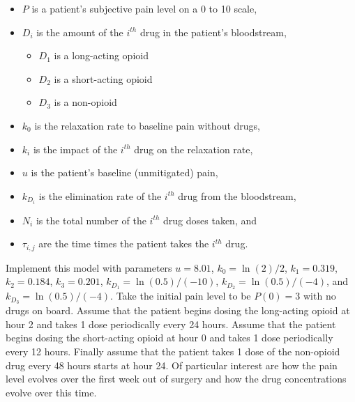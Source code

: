 \begin{itemize}
    \item $P$ is a patient's subjective pain level on a 0 to 10 scale, 
    \item $D_i$ is the amount of the $i^{th}$ drug in the
        patient's bloodstream,
        \begin{itemize}
            \item $D_1$ is a long-acting opioid
            \item $D_2$ is a short-acting opioid
            \item $D_3$ is a non-opioid
        \end{itemize}
    \item $k_0$ is the relaxation rate to baseline pain without drugs, 
    \item $k_i$ is the impact of the $i^{th}$ drug on the relaxation rate, 
    \item $u$ is the patient's baseline (unmitigated) pain, 
    \item $k_{D_i}$ is the elimination rate of the $i^{th}$ drug from the bloodstream, 
    \item $N_i$ is the total number of the $i^{th}$ drug doses taken, and 
    \item $\tau_{i,j}$ are the time times the patient takes the $i^{th}$ drug.
\end{itemize}
Implement this model with parameters
$u=8.01$, $k_0 = \ln(2)/2$, $k_1 = 0.319$, $k_2 = 0.184$, $k_3 = 0.201$, $k_{D_1} =
\ln(0.5)/(-10)$, $k_{D_2} = \ln(0.5)/(-4)$, and $k_{D_3} = \ln(0.5)/(-4)$.  Take the
initial pain level to be $P(0) = 3$ with no drugs on board.  Assume that the patient
begins dosing the long-acting opioid at hour 2 and takes 1 dose periodically every 24 hours.
Assume that the patient begins dosing the short-acting opioid at hour 0 and takes 1 dose
periodically every 12 hours.  Finally assume that the patient takes 1 dose of the non-opioid
drug every 48 hours starts at hour 24.  Of particular interest are how the pain level
evolves over the first week out of surgery and how the drug concentrations evolve
over this time.  

